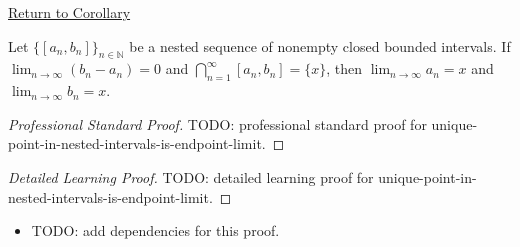 \newpage
{}
\label{prf:unique-point-in-nested-intervals-is-endpoint-limit}

\begin{remark*}[Return]
\hyperref[cor:unique-point-in-nested-intervals-is-endpoint-limit]{Return to Corollary}
\end{remark*}

\begin{corollary*}
Let $\{[a_n,b_n]\}_{n\in\mathbb N}$ be a nested sequence of nonempty closed
bounded intervals. If $\lim_{n\to\infty}(b_n-a_n)=0$ and
$\bigcap_{n=1}^{\infty}[a_n,b_n]=\{x\}$, then
$\lim_{n\to\infty}a_n=x$ and $\lim_{n\to\infty}b_n=x$.
\end{corollary*}

\begin{proof}[Professional Standard Proof]
\LRAProofBodyStart
TODO: professional standard proof for unique-point-in-nested-intervals-is-endpoint-limit.
\end{proof}

\begin{proof}[Detailed Learning Proof]
\LRAProofBodyStart
TODO: detailed learning proof for unique-point-in-nested-intervals-is-endpoint-limit.
\end{proof}

\begin{remark*}
\end{remark*}

\begin{dependencies}
\begin{itemize}
  \item TODO: add dependencies for this proof.
\end{itemize}
\end{dependencies}

\clearpage
